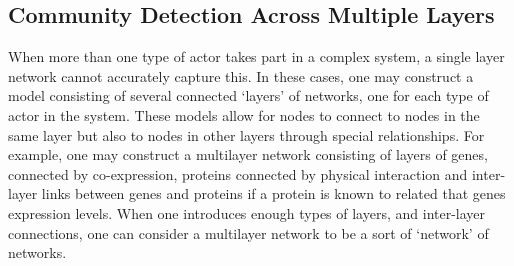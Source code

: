 \documentclass{report}
\begin{document}
	
	
	\subsection{Community Detection Across Multiple Layers}
	
	When more than one type of actor takes part in a complex system, a single layer network cannot accurately capture this. In these cases, one may construct a model consisting of several connected `layers' of networks, one for each type of actor in the system. These models allow for nodes to connect to nodes in the same layer but also to nodes in other layers through special relationships. For example, one may construct a multilayer network consisting of layers of genes, connected by co-expression, proteins connected by physical interaction and inter-layer links between genes and proteins if a protein is known to related that genes expression levels. When one introduces enough types of layers, and inter-layer connections, one can consider a multilayer network to be a sort of `network' of networks. 
	
\end{document}

